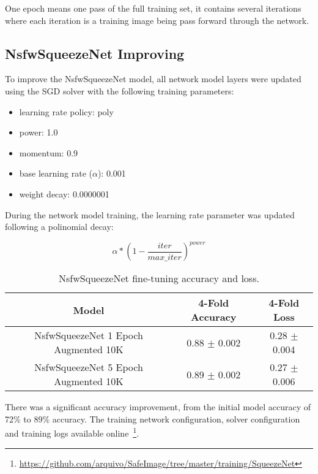 One epoch means one pass of the full training set, it contains several iterations where each iteration is a training image being pass forward through the network.

\subsection{NsfwSqueezeNet Improving}

To improve the NsfwSqueezeNet model, all network model layers were updated using the SGD solver with the following training parameters:

\begin{itemize}
\item learning rate policy: poly
\item power: 1.0
\item momentum: 0.9
\item base learning rate ($\alpha$): 0.001
\item weight decay: 0.0000001
\end{itemize}

During the network model training, the learning rate parameter was updated following a polinomial decay: 

$$\alpha * \left ( 1 - \frac{iter}{max\_iter} \right ) ^{power}$$

\begin{table}[H]
\centering
\caption{NsfwSqueezeNet fine-tuning accuracy and loss.}
\label{tbl:finetune_squeezenet}
\begin{tabular}{|c|c|c|}
\hline
Model                                                	& 4-Fold Accuracy  		& 4-Fold Loss      		\\ \hline
NsfwSqueezeNet 1 Epoch Augmented 10K 					& 0.88  $\pm$ 0.002		& 0.28 $\pm$ 0.004		\\ \hline
NsfwSqueezeNet 5 Epoch Augmented 10K 					& 0.89  $\pm$ 0.002 	& 0.27 $\pm$ 0.006  	\\ \hline
\end{tabular}
\end{table}

There was a significant accuracy improvement, from the initial model accuracy of 72\% to 89\% accuracy. The training network configuration, solver configuration and training logs available online~\footnote{\url{https://github.com/arquivo/SafeImage/tree/master/training/SqueezeNet}}.


